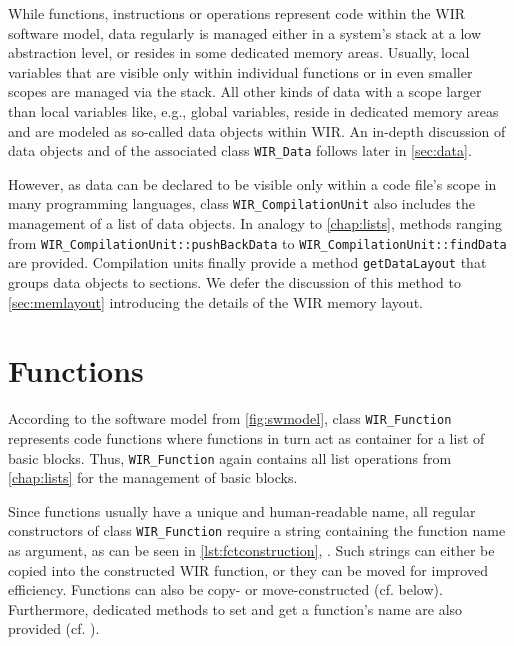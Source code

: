 While functions, instructions or operations represent code within the \gls{WIR} software model, data regularly is managed either in a system's stack at a low abstraction level, or resides in some dedicated memory areas.
Usually, local variables that are visible only within individual functions or in even smaller scopes are managed via the stack.
All other kinds of data with a scope larger than local variables like, e.g., global variables, reside in dedicated memory areas and are modeled as so-called data objects within \gls{WIR}.
An in-depth discussion of data objects and of the associated class \texttt{WIR\_Data} follows later in \cref{sec:data}.

However, as data can be declared to be visible only within a code file's scope in many programming languages, class \texttt{WIR\_CompilationUnit} also includes the management of a list of data objects.
In analogy to \cref{chap:lists}, methods ranging from \texttt{WIR\_CompilationUnit::pushBackData} to \texttt{WIR\_CompilationUnit::findData} are provided.
Compilation units finally provide a method \texttt{getDataLayout} that groups data objects to sections.
We defer the discussion of this method to \cref{sec:memlayout} introducing the details of the \gls{WIR} memory layout.


\section{Functions}
\label{sec:functions}

According to the software model from \cref{fig:swmodel}, class \texttt{WIR\_Function} represents code functions where functions in turn act as container for a list of basic blocks.
Thus, \texttt{WIR\_Function} again contains all list operations from \cref{chap:lists} for the management of basic blocks.

Since functions usually have a unique and human-readable name, all regular constructors of class \texttt{WIR\_Function} require a string containing the function name as argument, as can be seen in \cref{lst:fctconstruction}, .
Such strings can either be copied into the constructed \gls{WIR} function, or they can be moved for improved efficiency.
Functions can also be copy- or move-constructed (cf.  below).
Furthermore, dedicated methods to set and get a function's name are also provided (cf. ).

